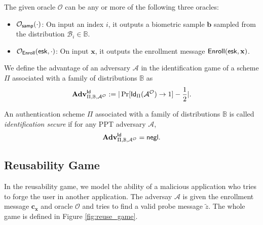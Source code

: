 The given oracle $\mathcal{O}$ can be any or more of the following three oracles:

\begin{itemize}
	\item $\mathcal{O}_{\sf samp}(\cdot)$: On input an index $i$, it outputs a biometric sample $\mathbf{b}$ sampled from the distribution $\mathcal{B}_i \in \mathbb{B}$.
	
	\item $\mathcal{O}_{\sf Enroll}({\sf esk}, \cdot)$: On input $\mathbf{x}$, it outputs the enrollment message ${\sf Enroll}({\sf esk}, \mathbf{x})$.

\end{itemize}

We define the advantage of an adversary $\mathcal{A}$ in the identification game of a scheme $\Pi$ associated with a family of distributions $\mathbb{B}$ as
\[
	\mathbf{Adv}^{\sf Id}_{\Pi, \mathbb{B}, \mathcal{A}^\mathcal{O}} := |\Pr[{\sf Id}_{\Pi}(\mathcal{A}^\mathcal{O}) \to 1] - \frac{1}{2}|.
\]

An authentication scheme $\Pi$ associated with a family of distributions $\mathbb{B}$ is called \emph{identification secure} if for any PPT adversary $\mathcal{A}$,
\[
	\mathbf{Adv}^{\sf Id}_{\Pi, \mathbb{B}, \mathcal{A}^\mathcal{O}} = \mathsf{negl}.
\]


\subsection{Reusability Game}
\label{sec:reuse_game}

In the reusability game, we model the ability of a malicious application who tries to forge the user in another application. The adversay $\mathcal{A}$ is given the enrollment message $\mathbf{c_x}$ and oracle $\mathcal{O}$ and tries to find a valid probe message $\tilde{z}$. The whole game is defined in Figure \ref{fig:reuse_game}.

